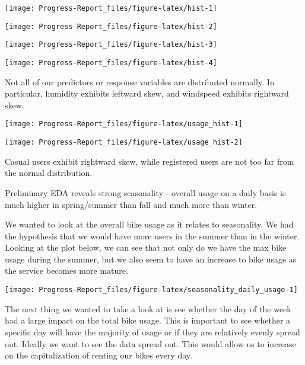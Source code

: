 \documentclass[
]{article}
\begin{document}
\begin{center}\texttt{[image: Progress-Report\_files/figure-latex/hist-1]} \end{center}

\begin{center}\texttt{[image: Progress-Report\_files/figure-latex/hist-2]} \end{center}

\begin{center}\texttt{[image: Progress-Report\_files/figure-latex/hist-3]} \end{center}

\begin{center}\texttt{[image: Progress-Report\_files/figure-latex/hist-4]} \end{center}

Not all of our predictors or response variables are distributed
normally. In particular, humidity exhibits leftward skew, and windspeed
exhibits rightward skew.

\begin{center}\texttt{[image: Progress-Report\_files/figure-latex/usage\_hist-1]} \end{center}

\begin{center}\texttt{[image: Progress-Report\_files/figure-latex/usage\_hist-2]} \end{center}

Casual users exhibit rightward skew, while registered users are not too
far from the normal distribution.

Preliminary EDA reveals strong seasonality - overall usage on a daily
basis is much higher in spring/summer than fall and much more than
winter.

We wanted to look at the overall bike usage as it relates to
seasonality. We had the hypothesis that we would have more users in the
summer than in the winter. Looking at the plot below, we can see that
not only do we have the max bike usage during the summer, but we also
seem to have an increase to bike usage as the service becomes more
mature.

\begin{center}\texttt{[image: Progress-Report\_files/figure-latex/seasonality\_daily\_usage-1]} \end{center}

The next thing we wanted to take a look at is see whether the day of the
week had a large impact on the total bike usage. This is important to
see whether a specific day will have the majority of usage or if they
are relatively evenly spread out. Ideally we want to see the data spread
out. This would allow us to increase on the capitalization of renting
our bikes every day.
\end{document}
